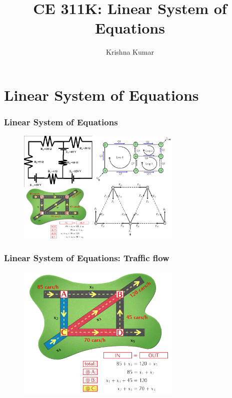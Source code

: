\documentclass[notes]{beamer}
\title[CE 311K: Linear Systems]{CE 311K: Linear System of Equations}
\author{Krishna Kumar} %
\institute[UT Austin] %
{
University of Texas at Austin \\
\medskip
\href{mailto:krishnak@utexas.edu}{krishnak@utexas.edu} %
}
\date{} %
\begin{document}
\begin{frame}
\titlepage %
\end{frame}

\newif\ifshowtoc
\showtoctrue%

\AtBeginSection{%
	\ifshowtoc
	\begin{frame}
		\tableofcontents[currentsection, subsectionstyle=show/show/hide]
	\end{frame}
	\fi
}


\section{Linear System of Equations}
\begin{frame}
	\frametitle{Linear System of Equations}
	\begin{figure}[ht]
		\centering
		\includegraphics[width=0.7\textwidth]{figs/linear-systems.png}
	\end{figure}
\end{frame}

\begin{frame}
	\frametitle{Linear System of Equations: Traffic flow}
	\begin{figure}[ht]
		\centering
		\includegraphics[width=0.7\textwidth]{figs/traffic-flow.png}
	\end{figure}
\end{frame}
\end{document}
